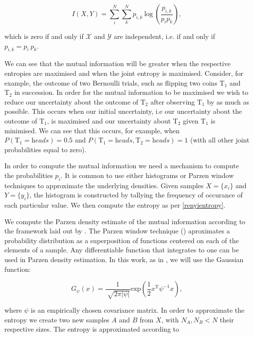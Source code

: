 \begin{equation}
	I(X, Y) = \sum_i^N\sum_k^N{p_{i,k} \: \text{log} \: (\frac{p_{i,k}}{p_ip_k})},
\end{equation}

\noindent which is zero if and only if $\mathcal{X}$ and $\mathcal{Y}$ are independent, i.e. if and only if $p_{i,k} = p_i\:p_k$. 

We can see that the mutual information will be greater when the respective entropies are maximised and when the joint entropy is maximised. Consider, for example, the outcome of two Bernoulli trials, such as flipping two coins $\text{T}_1$ and $\text{T}_2$ in succession. In order for the mutual information to be maximised we wish to reduce our uncertainty about the outcome of $\text{T}_2$ after observing $\text{T}_1$ by as much as possible. This occurs when our initial uncertainty, i.e our uncertainty about the outcome of $\text{T}_1$, is maximised and our uncertainty about $\text{T}_2$ given $\text{T}_1$ is minimised. We can see that this occurs, for example, when $P(\text{T}_1 = \textit{heads}) = 0.5$ and $P(\text{T}_1 = \textit{heads}, \text{T}_2 = \textit{heads}) = 1$ (with all other joint probabilities equal to zero).

In order to compute the mutual information we need a mechanism to compute the probabilities $p_i$. It is common to use either histograms or Parzen window techniques to approximate the underlying densities. Given samples $X = \{x_i\}$ and $Y = \{y_i\}$, the histogram is constructed by tallying the frequency of occurance of each particular value. We then compute the entropy as per \ref{renyientropy}.

We compute the Parzen density estimate of the mutual information according to the framework laid out by \cite{wells1996multi}. The Parzen window technique (\cite{duda2012pattern}) aproximates a probability distribution as a superposition of functions centered on each of the elements of a sample. Any differentiable function that integrates to one can be used in Parzen density estimation. In this work, as in \cite{wells1996multi}, we will use the Gaussian function:

\begin{equation}
	G_\psi(x) = \frac{1}{\sqrt[]{2\pi|\psi|}} \text{exp}\left(\frac{1}{2}x^\text{T}\psi^{-1}x\right),
\end{equation}

\noindent where $\psi$ is an empirically chosen covariance matrix. In order to approximate the entropy we create two new samples $A$ and $B$ from $X$, with $N_A, N_B < N$ their respective sizes. The entropy is approximated according to 

